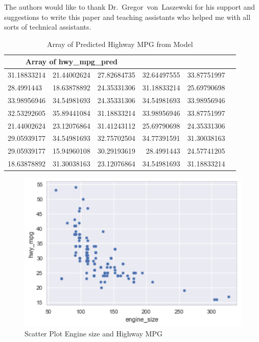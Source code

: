 \begin{acks}

  The authors would like to thank Dr.~Gregor~von~Laszewski for his
  support and suggestions to write this paper and teaching assistants who
  helped me with all sorts of technical assistants.

\end{acks}


\begin{table}[htb]
    \centering
    \begin{tabular}{llcrr p{8cm}}
    \hline
    \midrule
    \multicolumn{3}{c}{Array of hwy\_mpg\_pred}\\ \hline
  31.18833214 & 21.44002624 & 27.82684735 & 32.64497555 &  33.87751997 \\						
  28.4991443  &  18.63878892 & 24.35331306 & 31.18833214 & 25.69790698 \\						
  33.98956946 & 34.54981693 & 24.35331306 &  34.54981693 & 33.98956946 \\						
  32.53292605 & 35.89441084 & 31.18833214 &  33.98956946 & 33.87751997 \\						
  21.44002624 & 23.12076864 & 31.41243112 & 25.69790698 & 24.35331306 \\						
  29.05939177 & 34.54981693 & 32.75702504 & 34.77391591 & 31.30038163 \\						
  29.05939177 & 15.94960108 & 30.29193619 & 28.4991443  & 24.57741205 \\						
  18.63878892 & 31.30038163 & 23.12076864 & 34.54981693 & 31.18833214 \\
  \hline
  \midrule
    \end{tabular}
    \caption{Array of Predicted Highway MPG from  Model}
    \label{tab:PredMPG}
\end{table}




\begin{figure}[htb]
  \includegraphics[scale=1.0]{images/scatterplot.pdf}
  \caption{Scatter Plot Engine size and Highway MPG}
\label{fig:scatterplt}
\end{figure}

